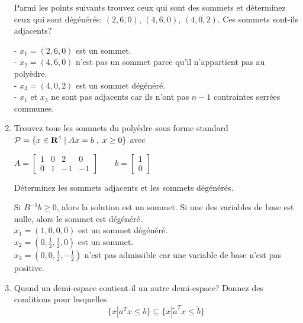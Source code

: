 \begin{enumerate}
    Parmi les points suivants trouvez ceux qui sont des sommets et déterminez ceux qui sont
    dégénérés: $(2, 6, 0)$, $(4, 6, 0)$, $(4, 0, 2)$. Ces sommets sont-ils adjacents?





    \begin{solution}
      - $x_{1} = (2,6,0) $ est un sommet.\\
      - $x_{2} = (4,6,0) $ n'est pas un sommet parce qu'il n'appartient pas au polyèdre.\\
      - $x_{3} = (4,0,2) $ est un sommet dégénéré. \\
      - $x_{1}$ et  $x_{3}$ ne sont pas adjacents car ils n'ont pas $n-1$ contraintes serrées communes.
    \end{solution}

  \item Trouvez  tous les sommets du poly\`edre sous forme standard ${\mathcal{P}}=\{x \in {\mbox{\bf R}}^4 \; | \; Ax=b \; , \; x \geq 0\}$ avec

    $
    A=
    \left[ \begin{array}{rrrr}
        1 & 0 & 2 & 0\\
        0 & 1 & -1 & -1
      \end{array}
    \right]
    \qquad
    b=
    \left[ \begin{array}{r}
        1 \\
        0
      \end{array}
    \right]$


    Déterminez les sommets adjacents et les sommets dégénérés.





    \begin{solution}
      Si $B^{-1}b \geq 0$, alors la solution est un sommet. Si une des variables de base est nulle, alors le sommet est dégénéré. \\
      $x_{1} = (1,0,0,0)$ est un sommet dégénéré. \\
      $x_{2} = (0,\frac{1}{2},\frac{1}{2},0)$ est un sommet. \\
      $x_{3} = (0,0,\frac{1}{2},-\frac{1}{2})$ n'est pas admissible car une variable de base n'est pas positive. \\
    \end{solution}

  \item Quand un demi-espace contient-il un autre demi-espace? Donnez des
    conditions pour lesquelles
    $$\{x | a^Tx \leq b \} \subseteq \{x | \tilde a ^Tx \leq \tilde b \}$$





\end{enumerate}
